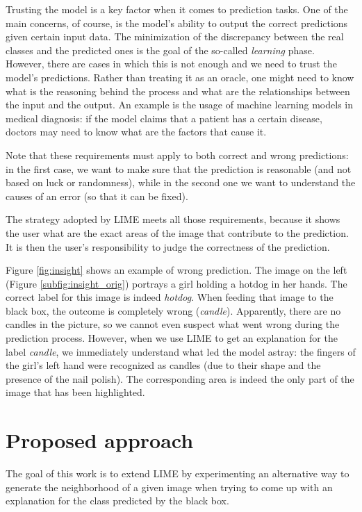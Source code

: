 \documentclass[12pt, twoside, a4paper]{report}
\begin{document}
Trusting the model is a key factor when it comes to prediction tasks. One of the main concerns, of course, is the model's ability to output the correct predictions given certain input data. The minimization of the discrepancy between the real classes and the predicted ones is the goal of the so-called \textit{learning} phase. However, there are cases in which this is not enough and we need to trust the model's predictions. Rather than treating it as an oracle, one might need to know what is the reasoning behind the process and what are the relationships between the input and the output. 
An example is the usage of machine learning models in medical diagnosis\cite{healthcare}: if the model claims that a patient has a certain disease, doctors may need to know what are the factors that cause it.

Note that these requirements must apply to both correct and wrong predictions: in the first case, we want to make sure that the prediction is reasonable (and not based on luck or randomness), while in the second one we want to understand the causes of an error (so that it can be fixed). 

The strategy adopted by LIME meets all those requirements, because it shows the user what are the exact areas of the image that contribute to the prediction. It is then the user's responsibility to judge the correctness of the prediction.


Figure \ref{fig:insight} shows an example of wrong prediction. The image on the left (Figure \ref{subfig:insight_orig}) portrays a girl holding a hotdog in her hands. The correct label for this image is indeed \textit{hotdog}. When feeding that image to the black box, the outcome is completely wrong (\textit{candle}). Apparently, there are no candles in the picture, so we cannot even suspect what went wrong during the prediction process. However, when we use LIME to get an explanation for the label \textit{candle}, we immediately understand what led the model astray: the fingers of the girl's left hand were recognized as candles (due to their shape and the presence of the nail polish). The corresponding area is indeed the only part of the image that has been highlighted.

\chapter{Proposed approach}\label{chapt:approach}
The goal of this work is to extend LIME by experimenting an alternative way to generate the neighborhood of a given image when trying to come up with an explanation for the class predicted by the black box. 
\end{document}
